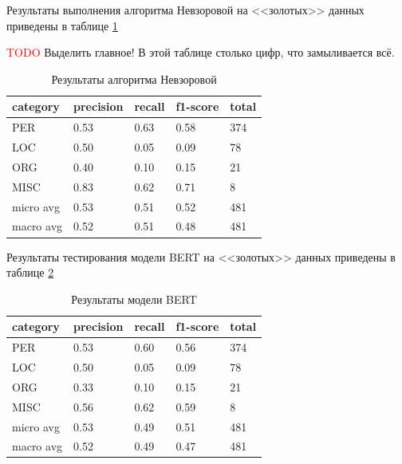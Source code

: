 Результаты выполнения алгоритма Невзоровой на <<золотых>> данных приведены в таблице \ref{table:Nevzorova_res_1}


\begin{table}[h!]

\textcolor{red}{TODO} Выделить главное! В этой таблице столько цифр, что замыливается всё.

\begin{tabular}{| l | l | l | l | l |}
\hline


 category &precision  &  recall & f1-score &  total\\
 \hline
 PER& 0.53&0.63&0.58& 374 \\
  \hline
 LOC& 0.50&0.05&0.09&  78 \\
  \hline
 ORG& 0.40&0.10&0.15&  21 \\ 
  \hline
 MISC& 0.83&0.62&0.71&   8 \\ 
 \hline
 \hline

micro avg& 0.53&0.51&0.52& 481 \\
 \hline 
macro avg& 0.52&0.51&0.48& 481 \\
\hline
\end{tabular}

\caption{Результаты алгоритма Невзоровой}
\label{table:Nevzorova_res_1}
\end{table}

Результаты тестирования модели BERT на <<золотых>> данных приведены в таблице \ref{table:BERT_res_1}

\begin{table}[h!]

\begin{tabular}{| l | l | l | l | l |}
\hline

 category &precision  &  recall & f1-score &  total\\
\hline
PER &  0.53 & 0.60 & 0.56 &  374 \\ 
\hline
LOC &  0.50 & 0.05 & 0.09 &   78 \\ 
\hline
ORG &  0.33 & 0.10 & 0.15 &   21 \\
\hline
MISC &  0.56 & 0.62 & 0.59 &   8 \\
\hline
\hline

micro avg &  0.53 & 0.49 & 0.51 &  481 \\
\hline
macro avg &  0.52 & 0.49 & 0.47 &  481 \\
\hline
\end{tabular}

\caption{Результаты модели BERT}
\label{table:BERT_res_1}
\end{table}

